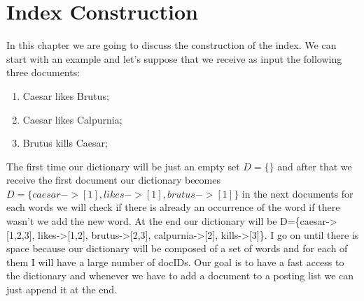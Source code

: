 \chapter{Index Construction}
In this chapter we are going to discuss the construction of the index. We can start with an example and let's suppose that we receive as input the following three documents:
\begin{enumerate}
    \item Caesar likes Brutus;
    \item Caesar likes Calpurnia;
    \item Brutus kills Caesar;
\end{enumerate}
The first time our dictionary will be just an empty set $D=\{\}$ and after that we receive the first document our dictionary becomes $D=\{caesar->[1], likes->[1], brutus->[1]\}$ in the next documents for each words we will check if there is already an occurrence of the word if there wasn't we add the new word. At the end our dictionary will be D=\{caesar->[1,2,3], likes->[1,2], brutus->[2,3], calpurnia->[2], kills->[3]\}. I go on until there is space because our dictionary will be composed of a set of words and for each of them I will have a large number of docIDs. Our goal is to have a fast access to the dictionary and whenever we have to add a document to a posting list we can just append it at the end.\newline
